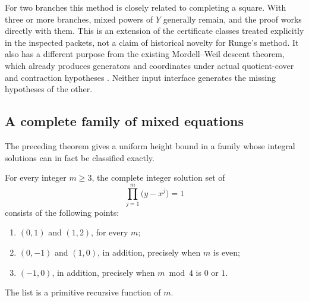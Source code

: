 For two branches this method is closely related to completing a
square.  With three or more branches, mixed powers of \(Y\) generally
remain, and the proof works directly with them.  This is an extension
of the certificate classes treated explicitly in the inspected packets,
not a claim of historical novelty for Runge's method.  It also has a
different purpose from the existing Mordell--Weil descent theorem,
which already produces generators and coordinates under actual
quotient-cover and contraction hypotheses \cite{mordellpacket}.
Neither input interface generates the missing hypotheses of the other.

\subsection{A complete family of mixed equations}

The preceding theorem gives a uniform height bound in a family whose
integral solutions can in fact be classified exactly.

\begin{theorem}
\label{thm:split-classification}
For every integer \(m\geq3\), the complete integer solution set of
\begin{equation}
 \prod_{j=1}^{m}\bigl(y-x^j\bigr)=1
 \label{eq:split-family}
\end{equation}
consists of the following points:
\begin{enumerate}
 \item \((0,1)\) and \((1,2)\), for every \(m\);
 \item \((0,-1)\) and \((1,0)\), in addition, precisely when
       \(m\) is even;
 \item \((-1,0)\), in addition, precisely when
       \(m\bmod4\) is \(0\) or \(1\).
\end{enumerate}
The list is a primitive recursive function of \(m\).
\end{theorem}

